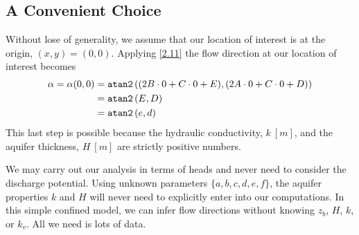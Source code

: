 \documentclass[12pt]{article}
\begin{document}
\subsection{A Convenient Choice}
Without lose of generality, we assume that our location of interest is at the origin, $(x,y) = (0,0)$.  Applying \eqref{2.11} the flow direction at our location of interest becomes
%
\begin{align}\label{5.1}
    \alpha = \alpha(0,0)
    &= \text{\tt atan2}\left((2B \cdot 0 + C \cdot 0 + E), (2A \cdot 0 + C \cdot 0 + D)\right) \nonumber\\
    &= \text{\tt atan2}\left(E, D\right) \nonumber\\
    &= \text{\tt atan2}\left(e, d\right)
\end{align}
%
This last step is possible because the hydraulic conductivity, $k~[m]$, and the aquifer thickness, $H~[m]$ are strictly positive numbers.

We may carry out our analysis in terms of heads and never need to consider the discharge potential.  Using unknown parameters $\{a, b, c, d, e, f \}$, the aquifer properties $k$ and $H$ will never need to explicitly enter into our computations.  In this simple confined model, we can infer flow directions without knowing $z_b$, $H$, $k$, or $k_v$. All we need is lots of data.

\end{document}
